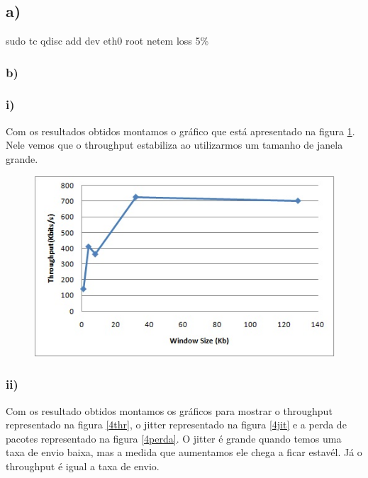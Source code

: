 \documentclass[12pt]{article}
\begin{document}
\section{}
\subsection{a)}
sudo tc qdisc add dev eth0 root netem loss 5\%
\subsubsection{b)}
\subsubsection{i)}
Com os resultados obtidos montamos o gráfico que está apresentado na figura \ref{4i}. Nele vemos que o throughput estabiliza ao utilizarmos um tamanho de janela grande.

\begin{figure}[ht]
\centering
\includegraphics[scale=0.7]{4i.jpg}
\caption{}
\label{4i}
\end{figure}
\newpage{} 

\subsubsection{ii)}
Com os resultado obtidos montamos os gráficos para mostrar o throughput representado na figura \ref{4thr}, o jitter representado na figura \ref{4jit} e a perda de pacotes representado na figura \ref{4perda}. O jitter é grande quando temos uma taxa de envio baixa, mas a medida que aumentamos ele chega a ficar estavél. Já o throughput é igual a taxa de envio.   
\end{document}
